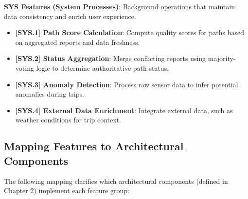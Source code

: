 \textbf{SYS Features (System Processes)}: Background operations that maintain data consistency and enrich user experience.

\begin{itemize}
    \item \textbf{[SYS.1] Path Score Calculation}: Compute quality scores for paths based on aggregated reports and data freshness.
    \item \textbf{[SYS.2] Status Aggregation}: Merge conflicting reports using majority-voting logic to determine authoritative path status.
    \item \textbf{[SYS.3] Anomaly Detection}: Process raw sensor data to infer potential anomalies during trips.
    \item \textbf{[SYS.4] External Data Enrichment}: Integrate external data, such as weather conditions for trip context.
\end{itemize}

\subsection{Mapping Features to Architectural Components}
\label{subsec:mapping-features-to-architecture}

The following mapping clarifies which architectural components (defined in Chapter 2) implement each feature group:

